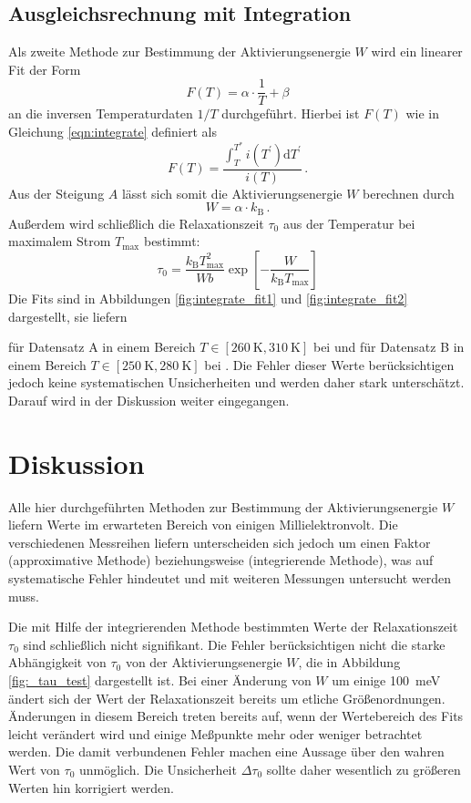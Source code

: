 \subsection{Ausgleichsrechnung mit Integration}
\label{subsec:integration}
Als zweite Methode zur Bestimmung der Aktivierungsenergie $W$ wird ein
linearer Fit der Form
\begin{equation*}
    F(T) = \alpha\cdot\frac{1}{T} + \beta
\end{equation*}
an die inversen Temperaturdaten $1/T$ durchgeführt.
Hierbei ist $F(T)$ wie in Gleichung \ref{eqn:integrate} definiert als
\begin{equation*}
    F(T) = \frac{\int_T^{T^\ast} i(T^\prime)\mathrm{d}T^\prime}{i(T)}\,.
\end{equation*}
Aus der Steigung $A$ lässt sich somit die Aktivierungsenergie $W$
berechnen durch
\begin{equation*}
    W = \alpha\cdot k_\text{B}\,.
\end{equation*}
Außerdem wird schließlich die Relaxationszeit $\tau_0$ aus der Temperatur
bei maximalem Strom $T_\text{max}$ bestimmt:
\begin{equation}
    \label{eqn:tau0}
    \tau_0 = \frac{k_\text{B}T_\text{max}^2}{Wb}
             \exp\!\left[-\frac{W}{k_\text{B}T_\text{max}} \right]
\end{equation}
Die Fits sind in Abbildungen \ref{fig:integrate_fit1} und \ref{fig:integrate_fit2}
dargestellt, sie liefern



für Datensatz A in einem Bereich $T \in [\SI{260}{\kelvin}, \SI{310}{\kelvin}]$ bei  und
für Datensatz B in einem Bereich $T \in [\SI{250}{\kelvin}, \SI{280}{\kelvin}]$ bei .
Die Fehler dieser Werte berücksichtigen jedoch keine systematischen Unsicherheiten
und werden daher stark unterschätzt. Darauf wird in der Diskussion weiter eingegangen.
\newpage
\section{Diskussion}
\label{sec:diskussion}
Alle hier durchgeführten Methoden zur Bestimmung der Aktivierungsenergie $W$
liefern Werte im erwarteten Bereich von einigen Millielektronvolt.
Die verschiedenen Messreihen liefern unterscheiden sich jedoch um einen Faktor
 (approximative Methode) beziehungsweise
 (integrierende Methode), was
auf systematische Fehler hindeutet und mit weiteren Messungen untersucht
werden muss.

Die mit Hilfe der integrierenden Methode bestimmten Werte der Relaxationszeit
$\tau_0$ sind schließlich nicht signifikant.
Die Fehler berücksichtigen nicht die starke Abhängigkeit von $\tau_0$ von der
Aktivierungsenergie $W$, die in Abbildung \ref{fig:_tau_test} dargestellt ist.
Bei einer Änderung von $W$ um einige \SI{100}{\milli\electronvolt} ändert
sich der Wert der Relaxationszeit bereits um etliche Größenordnungen.
Änderungen in diesem Bereich treten bereits auf, wenn der Wertebereich des Fits
leicht verändert wird und einige Meßpunkte mehr oder weniger betrachtet werden.
Die damit verbundenen Fehler machen eine Aussage über den wahren Wert von
$\tau_0$ unmöglich.
Die Unsicherheit $\Delta\tau_0$ sollte daher wesentlich zu größeren Werten hin
korrigiert werden.